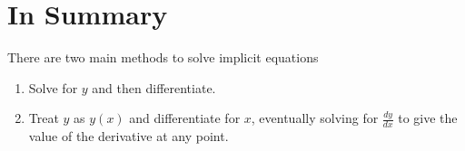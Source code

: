 \documentclass{ximera}
\begin{document}
\section{In Summary}
There are two main methods to solve implicit equations 
\begin{enumerate}
\item{Solve for $y$ and then differentiate.}
\item{Treat $y$ as $y(x)$ and differentiate for $x$, eventually solving for $\frac{dy}{dx}$ to give the value of the derivative at any point.}
\end{enumerate}
\pagebreak
\end{document}
